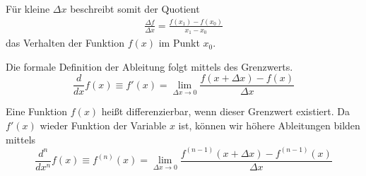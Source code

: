 Für kleine $\Delta x$ beschreibt somit der Quotient
\begin{align*}
\frac{\Delta f}{\Delta x} = \frac{f(x_1) - f(x_0)}{x_1-x_0}
\end{align*}
das Verhalten der Funktion $f(x)$ im Punkt $x_0$.\\

\begin{Definition}[Ableitung]
Die formale Definition der Ableitung folgt mittels des Grenzwerts.
\begin{equation}
\frac{d}{dx}f(x) \equiv f'(x) = \lim \limits_{\Delta x \to 0}
\frac{f(x+\Delta x) - f(x)}{\Delta x}
\end{equation}
\end{Definition}

Eine Funktion $f(x)$ heißt differenzierbar, wenn dieser Grenzwert existiert. Da
$f'(x)$ wieder Funktion der Variable $x$ ist, können wir höhere Ableitungen
bilden mittels
\begin{equation}
\frac{d^n}{dx^n}f(x) \equiv f^{(n)}(x) = \lim \limits_{\Delta x \to 0}
\frac{f^{(n-1)}(x+\Delta x) - f^{(n-1)}(x)}{\Delta x}
\end{equation}

